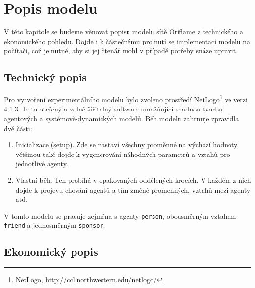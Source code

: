 \documentclass[a4wide,12pt]{report}
\begin{document}
\chapter{Popis modelu}
V této kapitole se budeme věnovat popisu modelu sítě Oriflame z technického a ekonomického pohledu. Dojde i k částečnému prolnutí se implementací modelu na počítači, což je nutné, aby si jej čtenář mohl v případě potřeby snáze upravit.
\section{Technický popis}
Pro vytvoření experimentálního modelu bylo zvoleno prostředí NetLogo\footnote{NetLogo, \url{http://ccl.northwestern.edu/netlogo/}} ve verzi 4.1.3. Je to oteřený a volně šiřitelný software umožňující snadnou tvorbu agentových a systémově-dynamických modelů. Běh modelu zahrnuje zpravidla dvě části:
\begin{enumerate}
\item Inicializace (setup). Zde se nastaví všechny proměnné na výchozí hodnoty, většinou také dojde k vygenerování náhodných parametrů a vztahů pro jednotlivé agenty.
\item Vlastní běh. Ten probíhá v opakovaných oddělených krocích. V každém z nich dojde k projevu chování agentů a tím změně promenných, vztahů mezi agenty atd.
\end{enumerate}
V tomto modelu se pracuje zejména s agenty \texttt{person}, obousměrným vztahem \texttt{friend} a jednosměrným \texttt{sponsor}.
\section{Ekonomický popis}
\end{document}
